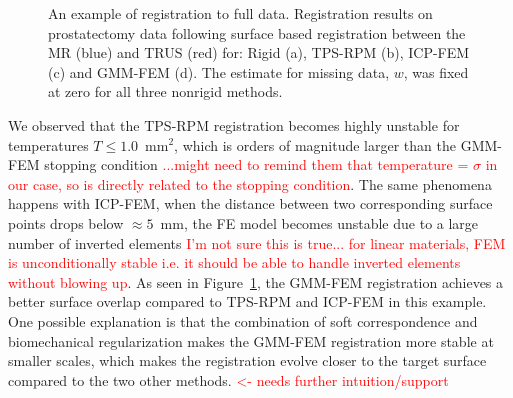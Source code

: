 \documentclass[journal]{IEEEtran}
\newcommand{\comment}[1]{\textcolor{red}{#1}}
\begin{document}
\begin{figure}
    \caption{An example of registration to full data. Registration results on prostatectomy data following surface based registration between the MR (blue) and TRUS (red) for: Rigid (a), TPS-RPM (b), ICP-FEM (c) and GMM-FEM (d). The estimate for missing data, $w$, was fixed at zero for all three nonrigid methods. \label{fig:exp2fig1}}
\end{figure}
We observed that the TPS-RPM registration becomes highly unstable for temperatures $T\leq1.0$~$\mathrm{mm}^2$, which is orders of magnitude larger than the GMM-FEM stopping condition \comment{...might need to remind them that temperature = $\sigma$ in our case, so is directly related to the stopping condition}. The same phenomena happens with ICP-FEM, when the distance between two corresponding surface points drops below $\approx5$~mm, the FE model becomes unstable due to a large number of inverted elements \comment{I'm not sure this is true... for linear materials, FEM is unconditionally stable i.e. it should be able to handle inverted elements without blowing up}. As seen in Figure~\ref{fig:exp2fig1}, the GMM-FEM registration achieves a better surface overlap compared to TPS-RPM and ICP-FEM in this example. One possible explanation is that the combination of soft correspondence and biomechanical regularization makes the GMM-FEM registration more stable at smaller scales, which makes the registration evolve closer to the target surface compared to the two other methods. \comment{<- needs further intuition/support}
\end{document}
